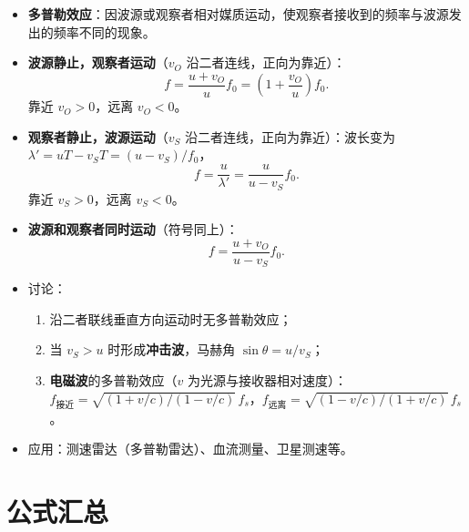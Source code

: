 \documentclass[12pt,a4paper]{ctexart}
\begin{document}
\begin{itemize}
    \item \textbf{多普勒效应}：因波源或观察者相对媒质运动，使观察者接收到的频率与波源发出的频率不同的现象。
    \item \textbf{波源静止，观察者运动}（$v_O$ 沿二者连线，正向为靠近）：
    \[
        f = \frac{u+v_O}{u}f_0 = \left(1+\frac{v_O}{u}\right)f_0.
    \]
    靠近 $v_O>0$，远离 $v_O<0$。
    \item \textbf{观察者静止，波源运动}（$v_S$ 沿二者连线，正向为靠近）：波长变为 $\lambda' = uT - v_ST = (u-v_S)/f_0$，
    \[
        f = \frac{u}{\lambda'} = \frac{u}{u-v_S}f_0.
    \]
    靠近 $v_S>0$，远离 $v_S<0$。
    \item \textbf{波源和观察者同时运动}（符号同上）：
    \[
        f = \frac{u+v_O}{u-v_S}f_0.
    \]
    \item 讨论：
    \begin{enumerate}
        \item 沿二者联线垂直方向运动时无多普勒效应；
        \item 当 $v_S>u$ 时形成\textbf{冲击波}，马赫角 $\sin\theta = u/v_S$；
        \item \textbf{电磁波}的多普勒效应（$v$ 为光源与接收器相对速度）：
        $f_{\text{接近}} = \sqrt{(1+v/c)/(1-v/c)}\,f_s$，$f_{\text{远离}} = \sqrt{(1-v/c)/(1+v/c)}\,f_s$。
    \end{enumerate}
    \item 应用：测速雷达（多普勒雷达）、血流测量、卫星测速等。
\end{itemize}

\section{公式汇总}
\end{document}

